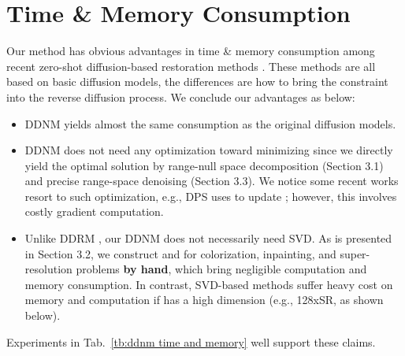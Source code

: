 \documentclass{article} \usepackage{iclr2023_conference,times}
\begin{document}
\section{Time \& Memory Consumption}
\label{ap: time and memory}
Our method has obvious advantages in time \& memory consumption among recent zero-shot diffusion-based restoration methods \citep{kawar2022denoising,ho2022video,chung2022improving,chung2022diffusion}. These methods are all based on basic diffusion models, the differences are how to bring the constraint  into the reverse diffusion process. We conclude our advantages as below:
\begin{itemize}
\item DDNM yields almost the same consumption as the original diffusion models.
\item DDNM does not need any optimization toward minimizing  since we directly yield the optimal solution by range-null space decomposition (Section 3.1) and precise range-space denoising (Section 3.3). We notice some recent works \citep{ho2022video,chung2022improving,chung2022diffusion} resort to such optimization, e.g., DPS \citep{chung2022diffusion} uses  to update ; however, this involves costly gradient computation. 
\item Unlike DDRM \citep{kawar2022denoising}, our DDNM does not necessarily need SVD. As is presented in Section 3.2, we construct  and  for colorization, inpainting, and super-resolution problems \textbf{by hand}, which bring negligible computation and memory consumption. In contrast, SVD-based methods suffer heavy cost on memory and computation if  has a high dimension (e.g., 128xSR, as shown below). 
\end{itemize}

Experiments in Tab.~\ref{tb:ddnm time and memory} well support these claims.
\end{document}

